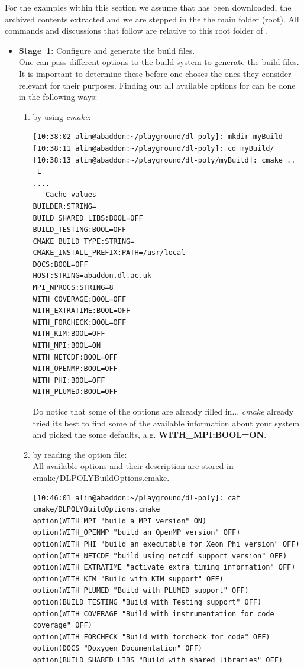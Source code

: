 For the examples within this section we assume that \D has been
downloaded, the archived contents extracted and we are stepped in the
the main folder (root).  All commands and discussions that follow are
relative to this root folder of \D.

\begin{itemize}
\item {\bf Stage~1}: Configure and generate the build files. \\

One can pass different options to the build system to generate
the build files.  It is important to determine these before one
choses the ones they consider relevant for their purposes.
Finding out all available options for \D can be done in the
following ways:

\begin{enumerate}[label=\textbf{\alph*)}]%
\item by using {\sl cmake}:
\begin{lstlisting}
[10:38:02 alin@abaddon:~/playground/dl-poly]: mkdir myBuild
[10:38:11 alin@abaddon:~/playground/dl-poly]: cd myBuild/
[10:38:13 alin@abaddon:~/playground/dl-poly/myBuild]: cmake .. -L
....
-- Cache values
BUILDER:STRING=
BUILD_SHARED_LIBS:BOOL=OFF
BUILD_TESTING:BOOL=OFF
CMAKE_BUILD_TYPE:STRING=
CMAKE_INSTALL_PREFIX:PATH=/usr/local
DOCS:BOOL=OFF
HOST:STRING=abaddon.dl.ac.uk
MPI_NPROCS:STRING=8
WITH_COVERAGE:BOOL=OFF
WITH_EXTRATIME:BOOL=OFF
WITH_FORCHECK:BOOL=OFF
WITH_KIM:BOOL=OFF
WITH_MPI:BOOL=ON
WITH_NETCDF:BOOL=OFF
WITH_OPENMP:BOOL=OFF
WITH_PHI:BOOL=OFF
WITH_PLUMED:BOOL=OFF
\end{lstlisting}

Do notice that some of the options are already filled in...
{\em cmake} already tried its best to find some of the
available information about your system and picked the some
defaults, a.g. {\bf WITH\_MPI:BOOL=ON}.

\item by reading the \D option file: \\
All available options and their description are stored in
{\sc cmake/DLPOLYBuildOptions.cmake}.
\begin{lstlisting}
[10:46:01 alin@abaddon:~/playground/dl-poly]: cat cmake/DLPOLYBuildOptions.cmake
option(WITH_MPI "build a MPI version" ON)
option(WITH_OPENMP "build an OpenMP version" OFF)
option(WITH_PHI "build an executable for Xeon Phi version" OFF)
option(WITH_NETCDF "build using netcdf support version" OFF)
option(WITH_EXTRATIME "activate extra timing information" OFF)
option(WITH_KIM "Build with KIM support" OFF)
option(WITH_PLUMED "Build with PLUMED support" OFF)
option(BUILD_TESTING "Build with Testing support" OFF)
option(WITH_COVERAGE "Build with instrumentation for code coverage" OFF)
option(WITH_FORCHECK "Build with forcheck for code" OFF)
option(DOCS "Doxygen Documentation" OFF)
option(BUILD_SHARED_LIBS "Build with shared libraries" OFF)


\end{lstlisting}
\end{enumerate}
\end{itemize}
